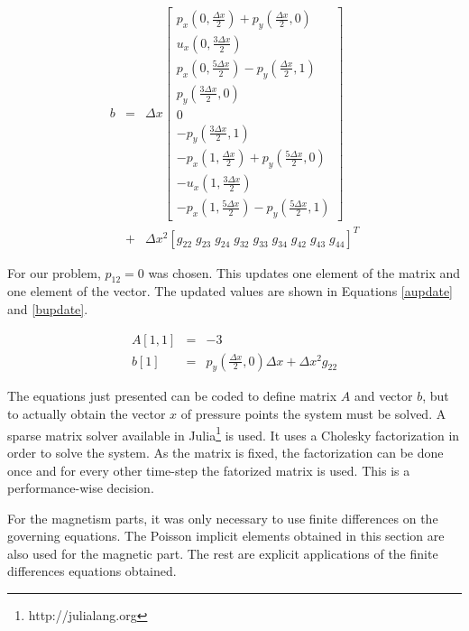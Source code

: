 \documentclass[journal]{IEEEtran}
\begin{document}
\begin{eqnarray}
b & = & \Delta x\left[\begin{array}{c}
p_x\left(0, \frac{\Delta x}{2}\right) + p_y\left(\frac{\Delta x}{2},0\right)\\
u_x\left(0, \frac{3\Delta x}{2}\right)\\
p_x\left(0, \frac{5\Delta x}{2}\right) - p_y\left(\frac{\Delta x}{2},1\right)\\
p_y\left(\frac{3\Delta x}{2},0\right)\\
0 \\
-p_y\left(\frac{3\Delta x}{2},1\right)\\
-p_x\left(1, \frac{\Delta x}{2}\right) + p_y\left(\frac{5\Delta x}{2},0\right)\\
-u_x\left(1, \frac{3\Delta x}{2}\right)\\
-p_x\left(1, \frac{5\Delta x}{2}\right) - p_y\left(\frac{5\Delta x}{2}, 1\right)
\end{array}\right] \nonumber\\
&+& \Delta x^2 \left[
g_{22}\; g_{23}\; g_{24}\; g_{32}\; g_{33}\; g_{34}\; g_{42}\; g_{43} \; g_{44}
\right]^T \label{bPartnulleigen}
\end{eqnarray}

For our problem, $p_{12} = 0$ was chosen. This updates one element of the matrix and one element of the vector. The updated values are shown in Equations \ref{aupdate} and \ref{bupdate}.

\begin{eqnarray}
A[1,1] &=& -3 \label{aupdate} \\
b[1] & = & p_y\left(\frac{\Delta x}{2},0\right)\Delta x + \Delta x^2 g_{22} \label{bupdate}
\end{eqnarray}

The equations just presented can be coded to define matrix $A$ and vector $b$, but to actually obtain the vector $x$ of pressure points the system must be solved. A sparse matrix solver available in Julia\footnote{http://julialang.org} is used. It uses a Cholesky factorization in order to solve the system. As the matrix is fixed, the factorization can be done once and for every other time-step the fatorized matrix is used. This is a performance-wise decision.

For the magnetism parts, it was only necessary to use finite differences on the governing equations. The Poisson implicit elements obtained in this section are also used for the magnetic part. The rest are explicit applications of the finite differences equations obtained.
\end{document}
